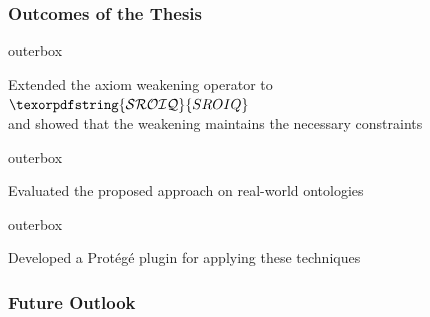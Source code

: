 \documentclass[aspectratio=169]{beamer}
\newcommand{\SROIQ}{\ensuremath{\texorpdfstring{\mathcal{SROIQ}}{SROIQ}}\xspace}
\newlength{\offsetpage}
\newenvironment{narrowpage}[1][1cm]{
  \setlength{\offsetpage}{#1}
  \begin{adjustwidth}{\offsetpage}{\offsetpage}
  \addtolength{\textwidth}{-2\offsetpage}
}{\end{adjustwidth}}
\newenvironment{items}{\begin{narrowpage}\vfill}{\end{narrowpage}}
\newenvironment{oitem}[1][\scriptsize\raisebox{0.6mm}{\color{unibzblue} $\blacktriangleright$}]{\hfill\begin{beamercolorbox}[rounded=true,colsep=2mm]{outerbox}\parbox[t]{5mm}{#1}\begin{minipage}[t]{\textwidth}}{\end{minipage}\end{beamercolorbox}\hfill\vfill}
\begin{document}
\begin{frame}
\frametitle{Outcomes of the Thesis}
\begin{items}
  \begin{oitem}
    Extended the axiom weakening operator to \SROIQ \\
    {\footnotesize and showed that the weakening maintains the necessary constraints}
  \end{oitem}
  \begin{oitem}
    Evaluated the proposed approach on real-world ontologies
  \end{oitem}
  \begin{oitem}
    Developed a Protégé plugin for applying these techniques
  \end{oitem}
\end{items}
\end{frame}

\begin{frame}
\frametitle{Future Outlook}


\end{frame}

{
\begin{frame}[plain]{}
\end{frame}
}
\end{document}

